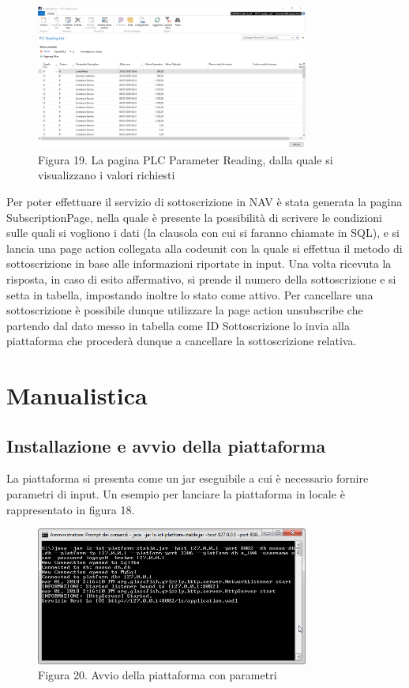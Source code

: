 \clearpage
\begin{figure}[H]
	\centering
	\includegraphics[width=0.8\textwidth]{PLC-Reading-List.png}
	\caption*{Figura 19. La pagina PLC Parameter Reading, dalla quale si visualizzano i valori richiesti}
\end{figure}
Per poter effettuare il servizio di sottoscrizione in NAV è stata generata la pagina SubscriptionPage, nella quale è presente la possibilità di scrivere le condizioni sulle quali si vogliono i dati (la clausola con cui si faranno chiamate in SQL), e si lancia una page action collegata alla codeunit con la quale si effettua il metodo di sottoscrizione in base alle informazioni riportate in input. Una volta ricevuta la risposta, in caso di esito affermativo, si prende il numero della sottoscrizione e si setta in tabella, impostando inoltre lo stato come attivo. Per cancellare una sottoscrizione è possibile dunque utilizzare la page action unsubscribe che partendo dal dato messo in tabella come ID Sottoscrizione lo invia alla piattaforma che procederà dunque a cancellare la sottoscrizione relativa. 
\clearpage
\section{Manualistica}
\subsection{Installazione e avvio della piattaforma}
La piattaforma si presenta come un jar eseguibile a cui è necessario fornire parametri di input. Un esempio per lanciare la piattaforma in locale è rappresentato in figura 18.
\begin{figure}[h]
			\centering
			\includegraphics[width=0.8\textwidth]{lancio-piattaforma.png}
			\caption*{Figura 20. Avvio della piattaforma con parametri}
\end{figure}

